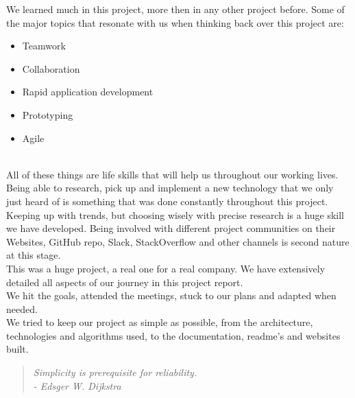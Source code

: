 We learned much in this project, more then in any other project before.
Some of the major topics that resonate with us when thinking back over this project are: 
\begin{itemize}[noitemsep,nolistsep]
\item Teamwork
\item Collaboration
\item Rapid application development
\item Prototyping
\item Agile
\end{itemize}
    \hfill 
    \\
All of these things are life skills that will help us throughout our working lives.
\\

Being able to research, pick up and implement a new technology that we only just heard of is something that was done constantly throughout this project.
Keeping up with trends, but choosing wisely with precise research is a huge skill we have developed.
Being involved with different project communities on their Websites, GitHub repo, Slack, StackOverflow and other channels is second nature at this stage.
\\

This was a huge project, a real one for a real company.
We have extensively detailed all aspects of our journey in this project report.
\\

We hit the goals, attended the meetings, stuck to our plans and adapted when needed.
\\

We tried to keep our project as simple as possible,
 from the architecture,  technologies and algorithms used, 
 to the documentation, readme's and websites built.
    \hfill 
    \\

\begin{quote}
    \itshape Simplicity is prerequisite for reliability.
    \hfill 
    \\
    - Edsger W. Dijkstra \cite{ewd_simplicity}
\end{quote}

